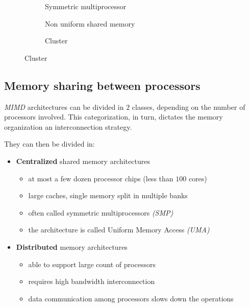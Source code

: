 \documentclass[english]{article}
\begin{document}
\begin{figure}[htbp]
  \begin{subfigure}[b]{0.33\textwidth}
    \bigskip
    \centering
    \caption{Symmetric multiprocessor}
    \label{subfig:symmetric-multiprocessor}
    \bigskip
  \end{subfigure}
  \begin{subfigure}[b]{0.33\textwidth}
    \bigskip
    \centering
    \caption{Non uniform shared memory}
    \label{subfig:non-uniform-shared-memory}
    \bigskip
  \end{subfigure}
  \begin{subfigure}[b]{0.33\textwidth}
    \bigskip
    \centering
    \caption{Cluster}
    \label{subfig:cluster}
    \bigskip
  \end{subfigure}
\end{figure}

\subsection{Memory sharing between processors}

\textit{MIMD} architectures can be divided in \(2\) classes, depending on the number of processors involved.
This categorization, in turn, dictates the memory organization an interconnection strategy.

They can then be divided in:

\begin{itemize}
  \item \textbf{Centralized} shared memory architectures
        \begin{itemize}
          \item at most a few dozen processor chips (less than \(100\) cores)
          \item large caches, single memory split in multiple banks
          \item often called symmetric multiprocessors \textit{(SMP)}
          \item the architecture is called Uniform Memory Access \textit{(UMA)}
        \end{itemize}
  \item \textbf{Distributed} memory architectures
        \begin{itemize}
          \item able to support large count of processors
          \item requires high bandwidth interconnection
          \item data communication among processors slows down the operations
        \end{itemize}
\end{itemize}
\end{document}
